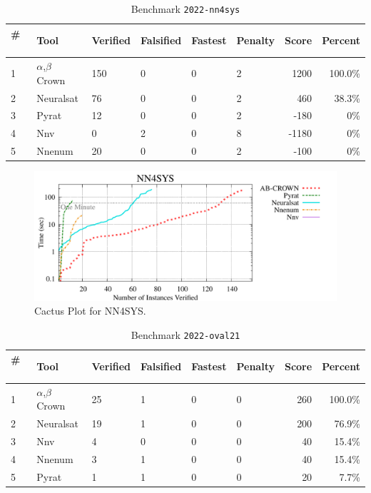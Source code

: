 

\begin{table}[h]
\begin{center}
\caption{Benchmark \texttt{2022-nn4sys}} \label{tab:cat_{cat}}
{\setlength{\tabcolsep}{2pt}
\begin{tabular}[h]{@{}llllllrr@{}}
\toprule
\textbf{\# ~} & \textbf{Tool} & \textbf{Verified} & \textbf{Falsified} & \textbf{Fastest} & \textbf{Penalty} & \textbf{Score} & \textbf{Percent}\\
\midrule
1 & $\alpha$,$\beta$ Crown & 150 & 0 & 0 & 2 & 1200 & 100.0\% \\
2 & Neuralsat & 76 & 0 & 0 & 2 & 460 & 38.3\% \\
3 & Pyrat & 12 & 0 & 0 & 2 & -180 & 0\% \\
4 & Nnv & 0 & 2 & 0 & 8 & -1180 & 0\% \\
5 & Nnenum & 20 & 0 & 0 & 2 & -100 & 0\% \\
\bottomrule
\end{tabular}
}
\end{center}
\end{table}



\begin{figure}[h]
\centerline{\includegraphics[width=\textwidth]{cactus/2022_nn4sys.pdf}}
\caption{Cactus Plot for NN4SYS.}
\label{fig:quantPic}
\end{figure}



\begin{table}[h]
\begin{center}
\caption{Benchmark \texttt{2022-oval21}} \label{tab:cat_{cat}}
{\setlength{\tabcolsep}{2pt}
\begin{tabular}[h]{@{}llllllrr@{}}
\toprule
\textbf{\# ~} & \textbf{Tool} & \textbf{Verified} & \textbf{Falsified} & \textbf{Fastest} & \textbf{Penalty} & \textbf{Score} & \textbf{Percent}\\
\midrule
1 & $\alpha$,$\beta$ Crown & 25 & 1 & 0 & 0 & 260 & 100.0\% \\
2 & Neuralsat & 19 & 1 & 0 & 0 & 200 & 76.9\% \\
3 & Nnv & 4 & 0 & 0 & 0 & 40 & 15.4\% \\
4 & Nnenum & 3 & 1 & 0 & 0 & 40 & 15.4\% \\
5 & Pyrat & 1 & 1 & 0 & 0 & 20 & 7.7\% \\
\bottomrule
\end{tabular}
}
\end{center}
\end{table}



